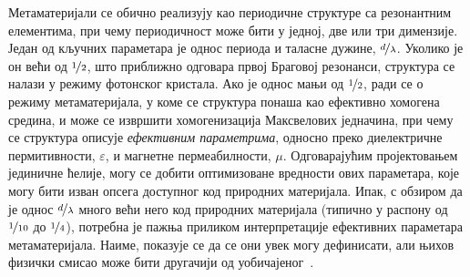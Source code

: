 \documentclass[main.tex]{subfiles}
\begin{document}
Метаматеријали се обично реализују као периодичне структуре са резонантним елементима, при чему периодичност може бити у једној, две или три димензије. Један од кључних параметара је однос периода и таласне дужине, $\nicefrac{d}{\lambda}$. Уколико је он већи од $\nicefrac{1}{2}$, што приближно одговара првој Браговој резонанси, структура се налази у режиму фотонског кристала. Ако је однос мањи од $\nicefrac{1}{2}$, ради се о режиму метаматеријала, у коме се структура понаша као ефективно хомогена средина, и може се извршити хомогенизација Максвелових једначина, при чему се структура описује \emph{ефективним параметрима}, односно преко диелектричне пермитивности, $\varepsilon$, и магнетне пермеабилности, $\mu$. Одговарајућим пројектовањем јединичне ћелије, могу се добити оптимизоване вредности ових параметара, које могу бити изван опсега доступног код природних материјала. Ипак, с обзиром да је однос $\nicefrac{d}{\lambda}$ много већи него код природних материјала (типично у распону од $\nicefrac{1}{10} $ до $ \nicefrac{1}{4}$), потребна је пажња приликом интерпретације ефективних параметара метаматеријала. Наиме, показује се да се они увек могу дефинисати, али њихов физички смисао може бити другачији од уобичајеног~\cite{simovski}.
\end{document}

